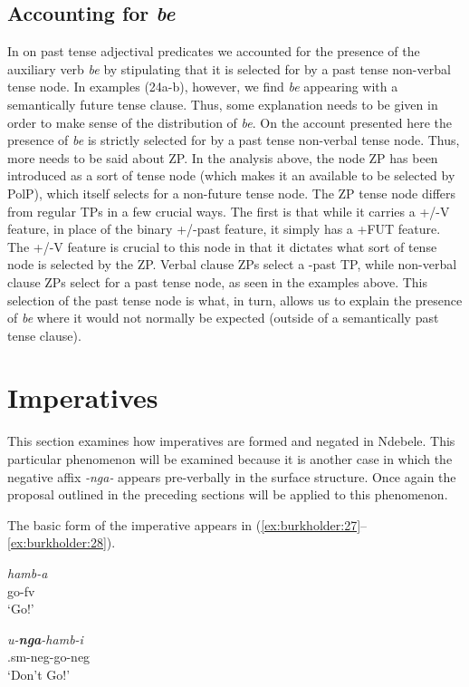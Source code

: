 \documentclass[output=paper]{langsci/langscibook}
\newcommand{\nga}[0]{\textit{-nga- }}
\newcommand{\bee}[0]{\textit{be }}
\begin{document}
\subsection{Accounting for \bee}\label{sec:burkholder:3.3.1}
In  on past tense adjectival predicates we accounted for the presence of the auxiliary verb \bee by stipulating that it is selected for by a past tense non-verbal tense node. In  examples (24a-b), however, we find \bee appearing with a semantically future tense clause. Thus, some explanation needs to be given in order to make sense of the distribution of \textit{be}. On the account presented here the presence of \bee is strictly selected for by a past tense non-verbal tense node. Thus, more needs to be said about ZP.
In the analysis above, the node ZP has been introduced as a sort of tense node (which makes it an available to be selected by PolP), which itself selects for a non-future tense node. The ZP tense node differs from regular TPs in a few crucial ways. The first is that while it carries a +/-V feature, in place of the binary +/-past feature, it simply has a +FUT feature. The +/-V feature is crucial to this node in that it dictates what sort of tense node is selected by the ZP. Verbal clause ZPs select a -past TP, while non-verbal clause ZPs select for a past tense node, as seen in the examples above. This selection of the past tense node is what, in turn, allows us to explain the presence of \bee where it would not normally be expected (outside of a semantically past tense clause). 
  
 
\section{Imperatives}\label{sec:burkholder:4}
This section examines how imperatives are formed and negated in Ndebele. This particular phenomenon will be examined because it is another case in which the negative affix \nga appears pre-verbally in the surface structure. Once again the proposal outlined in the preceding sections will be applied to this phenomenon.

The basic form of the imperative appears in (\ref{ex:burkholder:27}--\ref{ex:burkholder:28}).


\begin{exe}
\ex\label{ex:burkholder:27} \begin{xlist}
\ex\label{ex:burkholder:27a} \gll \textit{hamb-a}\\
        go-{\sc fv}\\
    \glt `Go!'

\ex\label{ex:burkholder:27b} \gll \textit{u-\textbf{nga}-hamb-i}\\
        .{\sc sm}-{\sc neg}-go-{\sc neg}\\
    \glt `Don't Go!'
\end{xlist}
\end{exe}
\end{document}
